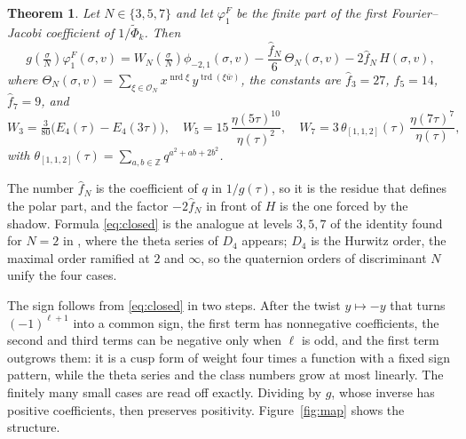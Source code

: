 \documentclass[11pt]{amsart}
\numberwithin{equation}{section}
\theoremstyle{plain}
\newtheorem{thm}{Theorem}[section]
\theoremstyle{remark}
\newcommand{\Z}{\mathbb{Z}}
\newcommand{\cO}{\mathcal{O}}
\newcommand{\pmi}{\phi_{-2,1}}
\newcommand{\tPhi}{\widetilde{\Phi}}
\begin{document}
\begin{thm}\label{thm:closed}
Let $N\in\{3,5,7\}$ and let $\varphi^F_1$ be the finite part of the first Fourier--Jacobi coefficient of $1/\tPhi_k$. Then
\begin{equation}\label{eq:closed}
g\!\left(\tfrac{\sigma}{N}\right)\varphi^F_1(\sigma,v)=W_N\!\left(\tfrac{\sigma}{N}\right)\pmi(\sigma,v)-\frac{\hat f_N}{6}\,\Theta_N(\sigma,v)-2\hat f_N\,H(\sigma,v),
\end{equation}
where $\Theta_N(\sigma,v)=\sum_{\xi\in\cO_N}x^{\operatorname{nrd}\xi}\,y^{\operatorname{trd}(\xi\bar w)}$, the constants are $\hat f_3=27$, $\hat f_5=14$, $\hat f_7=9$, and
\begin{equation}\label{eq:WN}
W_3=\tfrac{3}{80}\bigl(E_4(\tau)-E_4(3\tau)\bigr),\quad
W_5=15\,\frac{\eta(5\tau)^{10}}{\eta(\tau)^2},\quad
W_7=3\,\theta_{[1,1,2]}(\tau)\,\frac{\eta(7\tau)^7}{\eta(\tau)},
\end{equation}
with $\theta_{[1,1,2]}(\tau)=\sum_{a,b\in\Z}q^{a^2+ab+2b^2}$.
\end{thm}

The number $\hat f_N$ is the coefficient of $q$ in $1/g(\tau)$, so it is the residue that defines the polar part, and the factor $-2\hat f_N$ in front of $H$ is the one forced by the shadow. Formula \eqref{eq:closed} is the analogue at levels $3,5,7$ of the identity found for $N=2$ in \cite{Bha26a}, where the theta series of $D_4$ appears; $D_4$ is the Hurwitz order, the maximal order ramified at $2$ and $\infty$, so the quaternion orders of discriminant $N$ unify the four cases.

The sign follows from \eqref{eq:closed} in two steps. After the twist $y\mapsto -y$ that turns $(-1)^{\ell+1}$ into a common sign, the first term has nonnegative coefficients, the second and third terms can be negative only when $\ell$ is odd, and the first term outgrows them: it is a cusp form of weight four times a function with a fixed sign pattern, while the theta series and the class numbers grow at most linearly. The finitely many small cases are read off exactly. Dividing by $g$, whose inverse has positive coefficients, then preserves positivity. Figure~\ref{fig:map} shows the structure.
\end{document}
